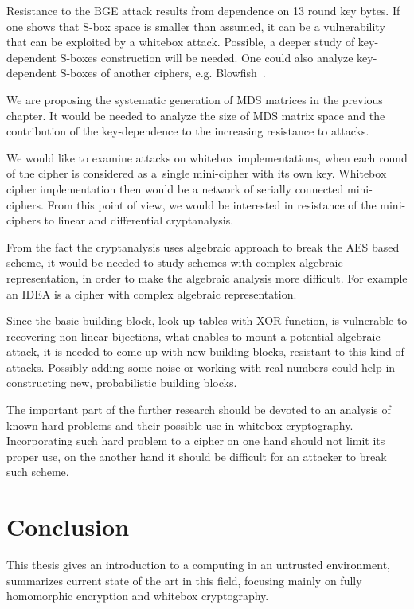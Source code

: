 \documentclass[11pt,oneside,final]{fithesis2}
\begin{document}
    Resistance to the BGE attack results from dependence on 13 round key bytes. If one shows that S-box space is smaller than assumed, it can be a vulnerability 
    that can be exploited by a whitebox attack. Possible, a deeper study of key-dependent S-boxes construction will be needed. One could also analyze key-dependent
    S-boxes of another ciphers, e.g. Blowfish~\citep{Schneier:1993:DNV:647930.740558}. 
    
    We are proposing the systematic generation of MDS matrices in the previous chapter. It would be needed to analyze the size of MDS matrix space and
    the contribution of the key-dependence to the increasing resistance to attacks.
    
    We would like to examine attacks on whitebox implementations, when each round of the cipher is considered as a~single mini-cipher with its own key. Whitebox
    cipher implementation then would be a network of serially connected mini-ciphers. From this point of view, we would be interested in resistance of the mini-ciphers
    to linear and differential cryptanalysis.

    From the fact the cryptanalysis uses algebraic approach to break the AES based scheme, it would be needed to study schemes with complex algebraic 
    representation, in order to make the algebraic analysis more difficult. For example an IDEA \citep{Lai:1991:PNB:112331.112375} is a cipher 
    with complex algebraic representation. 
    
    Since the basic building block, look-up tables with XOR function, is vulnerable to recovering non-linear bijections, what enables to mount 
    a potential algebraic attack, it is needed to come up with new building blocks, resistant to this kind of attacks. Possibly adding some noise or working
    with real numbers could help in constructing new, probabilistic building blocks.
    
    The important part of the further research should be devoted to an analysis of known hard problems and their possible use in whitebox cryptography.
    Incorporating such hard problem to a cipher on one hand should not limit its proper use, on the another hand it should be difficult for an attacker to break
    such scheme.     

\chapter{Conclusion}\label{sec:conclusion}   
    This thesis gives an introduction to a computing in an untrusted environment, summarizes current state of the art in this field, focusing 
    mainly on fully homomorphic encryption and whitebox cryptography.
    
\end{document}
